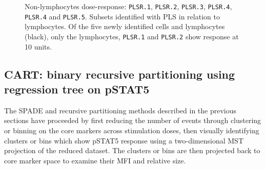 \begin{figure}
\begin{minipage}{.5\textwidth}
\end{minipage}
\begin{minipage}{.3\textwidth}
{ Non-lymphocytes dose-response: \texttt{PLSR.1}, \texttt{PLSR.2}, \texttt{PLSR.3}, \texttt{PLSR.4}, \texttt{PLSR.4} and \texttt{PLSR.5}. }
{
    Subsets identified with \gls{PLS} in relation to lymphocytes.
    Of the five newly identified cells and lymphocytes (black), only the lymphocytes, \texttt{PLSR.1} and \texttt{PLSR.2} show response at 10 units.
} 
\end{minipage}
\end{figure}

\subsection{CART: binary recursive partitioning using regression tree on pSTAT5}

The \gls{SPADE} and recursive partitioning methods described in the previous sections have proceeded by first reducing the number of events through clustering or binning
on the core markers across stimulation doses, then visually identifying clusters or bins which show pSTAT5 response using a two-dimensional \gls{MST} projection
of the reduced dataset. The clusters or bins are then projected back to core marker space to examine their MFI and relative size.

